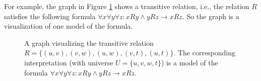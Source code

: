 \documentclass[11pt,a4paper]{uebung}
\begin{document}
For example, the graph in Figure \ref{fig:graph_transitive} shows a
transitive relation, i.e., the relation $R$ satisfies the following formula
$\forall x \forall y \forall z : x R y \land y R z \rightarrow x R z$. So the
graph is a visualization of one model of the formula.
\begin{figure}[ht]
  \centering
  \caption{A graph visualizing the transitive relation $R= \{ (u,v), (v,w),
    (u,w), (v,t), (u,t) \}$. The corresponding interpretation (with universe
    $U=\{u,v,w,t\}$) is a model of the formula $\forall x \forall y \forall z
    : x R y \land y R z \rightarrow x R z$.}
  \label{fig:graph_transitive}
\end{figure}
\end{document}
